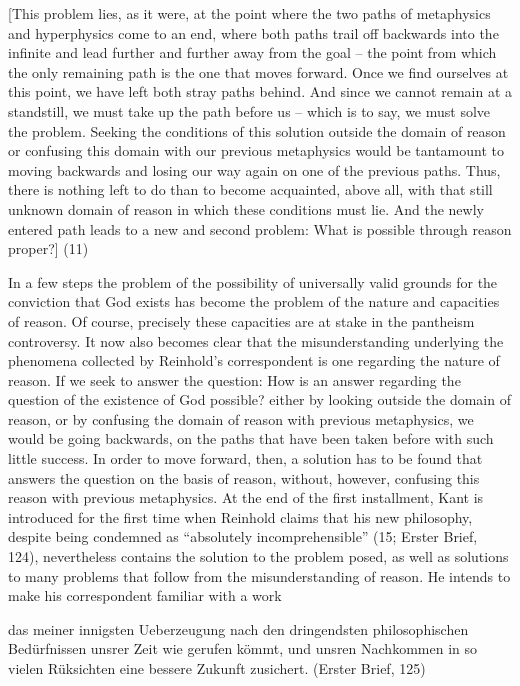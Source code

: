 [This problem lies, as it were, at the point where the two paths of metaphysics and hyperphysics come to an end, where both paths trail off backwards into the infinite and lead further and further away from the goal {--} the point from which the only remaining path is the one that moves forward. Once we find ourselves at this point, we have left both stray paths behind. And since we cannot remain at a standstill, we must take up the path before us {--} which is to say, we must solve the problem. Seeking the conditions of this solution outside the domain of reason or confusing this domain with our previous metaphysics would be tantamount to moving backwards and losing our way again on one of the previous paths. Thus, there is nothing left to do than to become acquainted, above all, with that still unknown domain of reason in which these conditions must lie. And the newly entered path leads to a new and second problem: What is possible through reason proper?] (11)

In a few steps the problem of the possibility of universally valid grounds for the conviction that God exists has become the problem of the nature and capacities of reason. Of course, precisely these capacities are at stake in the pantheism controversy. It now also becomes clear that the misunderstanding underlying the phenomena collected by Reinhold's correspondent is one regarding the nature of reason. If we seek to answer the question: How is an answer regarding the question of the existence of God possible? either by looking outside the domain of reason, or by confusing the domain of reason with previous metaphysics, we would be going backwards, on the paths that have been taken before with such little success. In order to move forward, then, a solution has to be found that answers the question on the basis of reason, without, however, confusing this reason with previous metaphysics. At the end of the first installment, Kant is introduced for the first time when Reinhold claims that his new philosophy, despite being condemned as ``absolutely incomprehensible'' (15; Erster Brief, 124), nevertheless contains the solution to the problem posed, as well as solutions to many problems that follow from the misunderstanding of reason. He intends to make his correspondent familiar with a work

das meiner innigsten Ueberzeugung nach den dringendsten philosophischen Bed\"{u}rfnissen unsrer Zeit wie gerufen k\"{o}mmt, und unsren Nachkommen in so vielen R\"{u}ksichten eine bessere Zukunft zusichert. (Erster Brief, 125)

